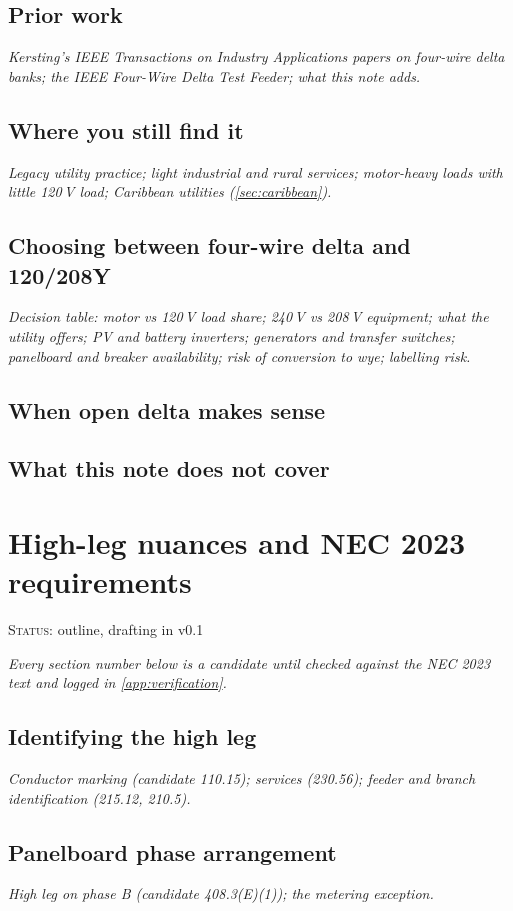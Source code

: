 \documentclass[11pt,a4paper]{article}
\newcommand{\plan}[1]{\par{\small\color{gray}\itshape #1}\par}
\newcommand{\status}[1]{{\small\color{orange!80!black}\textsc{Status:} #1}\par\medskip}
\begin{document}
\subsection{Prior work}
\plan{Kersting's IEEE Transactions on Industry Applications papers on four-wire delta banks; the IEEE Four-Wire Delta Test Feeder; what this note adds.}
\subsection{Where you still find it}
\plan{Legacy utility practice; light industrial and rural services; motor-heavy loads with little 120\,V load; Caribbean utilities (\cref{sec:caribbean}).}
\subsection{Choosing between four-wire delta and 120/208Y}
\plan{Decision table: motor vs 120\,V load share; 240\,V vs 208\,V equipment; what the utility offers; PV and battery inverters; generators and transfer switches; panelboard and breaker availability; risk of conversion to wye; labelling risk.}
\subsection{When open delta makes sense}
\subsection{What this note does not cover}

\section{High-leg nuances and NEC 2023 requirements}\label{sec:nec}
\status{outline, drafting in v0.1}
\plan{Every section number below is a candidate until checked against the NEC 2023 text and logged in \cref{app:verification}.}

\subsection{Identifying the high leg}
\plan{Conductor marking (candidate 110.15); services (230.56); feeder and branch identification (215.12, 210.5).}
\subsection{Panelboard phase arrangement}
\plan{High leg on phase B (candidate 408.3(E)(1)); the metering exception.}
\end{document}
